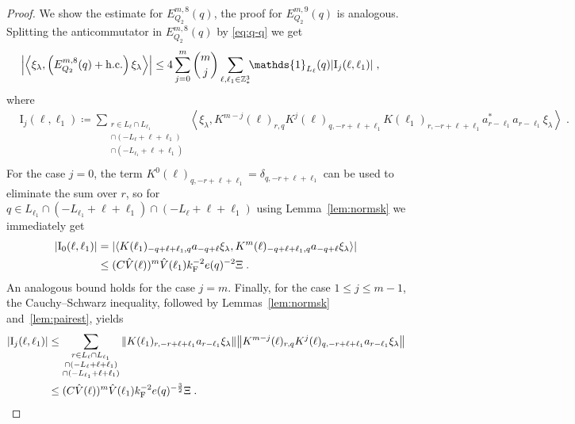 \documentclass[12pt,a4paper]{article}
\numberwithin{equation}{section}
\newcommand{\1}{\mathbb{I}}
\newcommand{\F}{\mathrm{F}}
\newcommand{\I}{\mathrm{I}}
\newcommand{\Z}{\mathbb{Z}}
\newcommand{\eva}[1]{\left\langle #1 \right\rangle}
\theoremstyle{plain}
\theoremstyle{definition}
\theoremstyle{remark}
\theoremstyle{plain}
\theoremstyle{definition}
\theoremstyle{remark}
\begin{document}
\begin{proof}
We show the estimate for $ E^{m,8}_{Q_2}(q) $, the proof for $ E^{m,9}_{Q_2}(q) $ is analogous.
Splitting the anticommutator in $ E^{m,8}_{Q_2}(q) $ by \eqref{eq:q-q} we get
\begin{equation} \label{eq:EQ2181}
\begin{aligned}
	& \abs{\eva{\xi_\lambda,\left(E^{m,8}_{Q_2}(q) + \mathrm{h.c.}\right) \xi_\lambda }}
	\le 4 \sum_{j=0}^m {{m}\choose j} \sum_{\ell,\ell_1 \in \Z^3_*}\!\! \mathds{1}_{L_\ell}(q) |\I_j(\ell, \ell_1)| \;,
	\end{aligned}
\end{equation}
where
\begin{equation}
\begin{aligned}
	& \I_j(\ell, \ell_1)
	\coloneq \sum_{\substack{r\in L_{\ell} \cap L_{\ell_1}\\\cap (-L_{\ell}+\ell+\ell_1) \\ \cap (-L_{\ell_1}+\ell+\ell_1)}}
		\eva{\xi_\lambda, K^{m-j}(\ell)_{r,q} K^{j}(\ell)_{q,-r+\ell+\ell_1} K(\ell_1)_{r,-r+\ell+\ell_1} a^*_{r-\ell_1} a_{r-\ell_1} \xi_\lambda} \;. \\
\end{aligned}
\end{equation}
For the case $ j = 0 $, the term $ K^0(\ell)_{q,-r+\ell+\ell_1} = \delta_{q,-r+\ell+\ell_1} $ can be used to eliminate the sum over $ r $, so for $ q \in L_{\ell_1} \cap (-L_{\ell_1} + \ell + \ell_1) \cap (-L_\ell + \ell + \ell_1) $ using Lemma~\ref{lem:normsk} we immediately get
\begin{equation}\label{eq:estEQ2181}
\begin{aligned}
	|\I_0(\ell, \ell_1)|
	& = \abs{\eva{ K(\ell_1)_{-q+\ell+\ell_1,q} a_{-q+\ell} \xi_\lambda, K^m(\ell)_{-q+\ell+\ell_1,q} a_{-q+\ell} \xi_\lambda }} \\
	& \leq (C \hat{V}(\ell))^m
		\hat{V}(\ell_1)
		k_{\F}^{-2} e(q)^{-2} \Xi \;.
\end{aligned}
\end{equation}
An analogous bound holds for the case $ j = m $. Finally, for the case $ 1 \le j \le m-1 $, the Cauchy--Schwarz inequality, followed by Lemmas~\ref{lem:normsk} and~\ref{lem:pairest}, yields
\begin{align}
	|\I_j(\ell, \ell_1)|
	&\leq \sum_{\substack{r\in L_{\ell} \cap L_{\ell_1}\\\cap (-L_{\ell}+\ell+\ell_1) \\ \cap (-L_{\ell_1}+\ell+\ell_1)}} \norm{ K(\ell_1)_{r,-r+\ell+\ell_1} a_{r-\ell_1} \xi_\lambda} \norm{ K^{m-j}(\ell)_{r,q} K^j(\ell)_{q,-r+\ell+\ell_1} a_{r-\ell_1} \xi_\lambda} \nonumber\\
	&\leq (C \hat{V}(\ell))^m
		\hat{V}(\ell_1)
		k_{\F}^{-2} e(q)^{-\frac 32} \Xi \;. \qedhere \nonumber
\end{align}
\end{proof}
\end{document}
